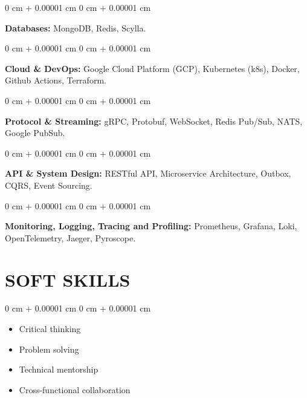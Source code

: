 \documentclass[10pt, letterpaper]{article}
\newenvironment{highlightsforbulletentries}{
    \begin{itemize}[
        topsep=0.10 cm,
        parsep=0.10 cm,
        partopsep=0pt,
        itemsep=0pt,
        leftmargin=10pt
    ]
}{
    \end{itemize}
} %
\newenvironment{onecolentry}{
    \begin{adjustwidth}{
        0 cm + 0.00001 cm
    }{
        0 cm + 0.00001 cm
    }
}{
    \end{adjustwidth}
} %
\begin{document}
    \vspace{0.2 cm}

    \begin{onecolentry}
        \textbf{Databases:} MongoDB, Redis, Scylla.
    \end{onecolentry}

    \vspace{0.2 cm}

    \begin{onecolentry}
        \textbf{Cloud \& DevOps:} Google Cloud Platform (GCP), Kubernetes (k8s), Docker, Github Actions, Terraform.
    \end{onecolentry}

    \vspace{0.2 cm}

    \begin{onecolentry}
        \textbf{Protocol \& Streaming:} gRPC, Protobuf, WebSocket, Redis Pub/Sub, NATS, Google PubSub.
    \end{onecolentry}

    \vspace{0.2 cm}

    \begin{onecolentry}
        \textbf{API \& System Design:} RESTful API, Microservice Architecture, Outbox, CQRS, Event Sourcing.
    \end{onecolentry}

    \vspace{0.2 cm}

    \begin{onecolentry}
        \textbf{Monitoring, Logging, Tracing and Profiling:} Prometheus, Grafana, Loki, OpenTelemetry, Jaeger, Pyroscope.
    \end{onecolentry}

    \section{SOFT SKILLS}

    \begin{onecolentry}
        \begin{highlightsforbulletentries}
            \item Critical thinking
            \item Problem solving
            \item Technical mentorship
            \item Cross-functional collaboration
        \end{highlightsforbulletentries}
    \end{onecolentry}
\end{document}
